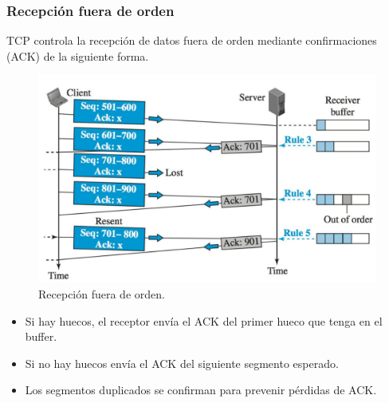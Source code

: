\subsubsection{Recepción fuera de orden}
TCP controla la recepción de datos fuera de orden mediante confirmaciones (ACK) de la siguiente forma.
\begin{figure}[H]
    \centering
    \includegraphics[width=\textwidth]{img/TCPooo.png}
    \caption{Recepción fuera de orden.}
\end{figure}
\begin{itemize}
    \item Si hay huecos, el receptor envía el ACK del primer hueco que tenga en el buffer.
    \item Si no hay huecos envía el ACK del siguiente segmento esperado.
    \item Los segmentos duplicados se confirman para prevenir pérdidas de ACK.
\end{itemize}
